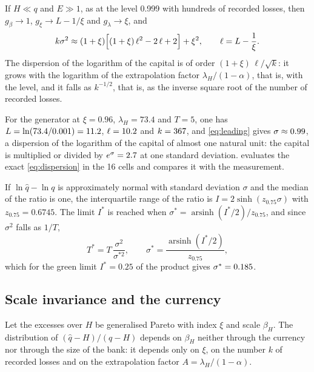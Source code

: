 \begin{corollary}
\label{cor:leading}
If $H\ll q$ and $E\gg1$, as at the level 0.999 with hundreds of recorded losses, then $g_\beta\to1$, $g_\xi\to L-1/\xi$ and $g_\lambda\to\xi$, and
\begin{equation}
k\sigma^2\approx(1+\xi)\Bigl[(1+\xi)\,\ell^{2}-2\,\ell+2\Bigr]+\xi^{2},\qquad \ell=L-\frac1\xi .
\label{eq:leading}
\end{equation}
The dispersion of the logarithm of the capital is of order $(1+\xi)\,\ell/\sqrt k$: it grows with the logarithm of the extrapolation factor $\lambda_H/(1-\alpha)$, that is, with the level, and it falls as $k^{-1/2}$, that is, as the inverse square root of the number of recorded losses.
\end{corollary}

For the generator at $\xi=0.96$, $\lambda_H=73.4$ and $T=5$, one has $L=\ln(73.4{}/0.001)=11.2{}$, $\ell=10.2{}$ and $k=367{}$, and \cref{eq:leading} gives $\sigma\approx0.99{}$, a dispersion of the logarithm of the capital of almost one natural unit: the capital is multiplied or divided by $e^{\sigma}=2.7{}$ at one standard deviation.  evaluates the exact \cref{eq:dispersion} in the 16 cells and compares it with the measurement.

\begin{corollary}
\label{cor:history}
If $\ln\hat q-\ln q$ is approximately normal with standard deviation $\sigma$ and the median of the ratio is one, the interquartile range of the ratio is $I=2\sinh(z_{0.75}\sigma)$ with $z_{0.75}=0.6745$. The limit $I^\ast$ is reached when $\sigma^\ast=\operatorname{arsinh}(I^\ast/2)/z_{0.75}$, and since $\sigma^2$ falls as $1/T$,
\begin{equation}
T^\ast=T\,\frac{\sigma^2}{\sigma^{\ast2}},\qquad \sigma^\ast=\frac{\operatorname{arsinh}(I^\ast/2)}{z_{0.75}},
\label{eq:years}
\end{equation}
which for the green limit $I^\ast=0.25$ of the product gives $\sigma^\ast=0.185{}$.
\end{corollary}

\subsection{Scale invariance and the currency}
\label{sec:theory-invariance}

\begin{proposition}
\label{prop:invariance}
Let the excesses over $H$ be generalised Pareto with index $\xi$ and scale $\beta_H$. The distribution of $(\hat q-H)/(q-H)$ depends on $\beta_H$ neither through the currency nor through the size of the bank: it depends only on $\xi$, on the number $k$ of recorded losses and on the extrapolation factor $A=\lambda_H/(1-\alpha)$.
\end{proposition}


